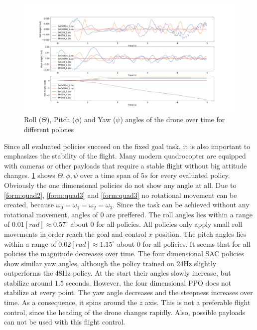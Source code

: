 \newpage

\begin{figure}
	\centering
	\includegraphics[width=\linewidth]{figures/angles.png}
	\caption{Roll ($\Theta$), Pitch ($\phi$) and Yaw ($\psi$) angles of the drone over time 
	for different policies}
	\label{fig:angles}
\end{figure}
Since all evaluated policies succeed on the fixed goal task, it is 
also important to emphasizes the stability of the flight.
Many modern quadrocopter are equipped with cameras or other payloads
that require a stable flight without big attitude changes.
\cref{fig:angles} shows $\Theta, \phi, \psi$ over a time span of $5s$ for
every evaluated policy.
Obviously the one dimensional policies do not show any angle at all.
Due to \cref{form:quad2}, \cref{form:quad3} and \cref{form:quad3}
no rotational movement can be created, because $\omega_0 = \omega_1 = \omega_2 = \omega_3$.
Since the task can be achieved without any rotational movement, angles of $0$ are preffered.
The roll angles lies within a range of $0.01[rad] \approx 0.57^{\circ}$ about 
$0$ for all policies. All policies only apply small roll movements in order
reach the goal and control $x$ position.
The pitch angles lies within a range of $0.02[rad] \approx 1.15^{\circ}$ about 
$0$ for all policies. 
It seems that for all policies the magnitude decreases over time.
The four dimensional SAC policies show similar yaw angles, although
the policy trained on 24Hz slightly outperforms the 48Hz policy.
At the start their angles slowly increase, but stabilize around $1.5$ seconds.
However, the four dimensional PPO does not stabilize at every point.
The yaw angle decreases and the steepness increases over time.
As a consequence, it spins around the $z$ axis. This is not a
preferable flight control, since the heading of the drone changes
rapidly. Also, possible payloads can not be used
with this flight control.


